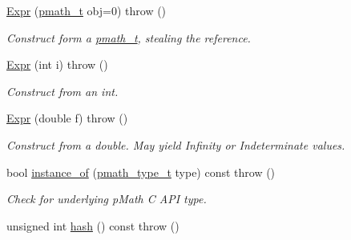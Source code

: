 \begin{CompactItemize}
\item 
\hypertarget{classpmath_1_1_expr_d94402d41c5577a24eb8775d01f70dce}{
\hyperlink{classpmath_1_1_expr_d94402d41c5577a24eb8775d01f70dce}{Expr} (\hyperlink{classpmath__t}{pmath\_\-t} obj=0)  throw ()}
\label{classpmath_1_1_expr_d94402d41c5577a24eb8775d01f70dce}

\begin{CompactList}\small\item\em Construct form a \hyperlink{classpmath__t}{pmath\_\-t}, stealing the reference. \item\end{CompactList}\item 
\hypertarget{classpmath_1_1_expr_b50be52de56188da3fcbedce42804570}{
\hyperlink{classpmath_1_1_expr_b50be52de56188da3fcbedce42804570}{Expr} (int i)  throw ()}
\label{classpmath_1_1_expr_b50be52de56188da3fcbedce42804570}

\begin{CompactList}\small\item\em Construct from an int. \item\end{CompactList}\item 
\hypertarget{classpmath_1_1_expr_c1940d712bf288f88cd15ad14010821c}{
\hyperlink{classpmath_1_1_expr_c1940d712bf288f88cd15ad14010821c}{Expr} (double f)  throw ()}
\label{classpmath_1_1_expr_c1940d712bf288f88cd15ad14010821c}

\begin{CompactList}\small\item\em Construct from a double. May yield Infinity or Indeterminate values. \item\end{CompactList}\item 
\hypertarget{classpmath_1_1_expr_3475bb9133af2108b98b06ea021abccb}{
bool \hyperlink{classpmath_1_1_expr_3475bb9133af2108b98b06ea021abccb}{instance\_\-of} (\hyperlink{group__objects_ge2646df76dcb0113715322b13a1f36f0}{pmath\_\-type\_\-t} type) const   throw ()}
\label{classpmath_1_1_expr_3475bb9133af2108b98b06ea021abccb}

\begin{CompactList}\small\item\em Check for underlying pMath C API type. \item\end{CompactList}\item 
\hypertarget{classpmath_1_1_expr_c9d1c162d3fb9070d2613e8778a7a77b}{
unsigned int \hyperlink{classpmath_1_1_expr_c9d1c162d3fb9070d2613e8778a7a77b}{hash} () const   throw ()}
\label{classpmath_1_1_expr_c9d1c162d3fb9070d2613e8778a7a77b}


\end{CompactItemize}

